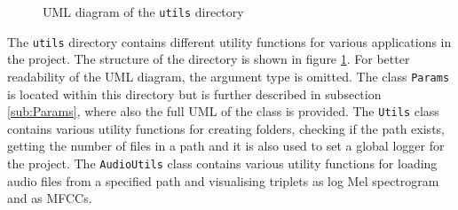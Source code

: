 \begin{figure}[htbp]
{
    }
	\caption{UML diagram of the \texttt{utils} directory}
	\label{fig:UML-Utils}
\end{figure}
\noindent
The \texttt{utils} directory contains different utility functions for various applications in the project. The structure of the directory is shown in figure \ref{fig:UML-Utils}. For better readability of the UML diagram, the argument type is omitted. The class \texttt{Params} is located within this directory but is further described in subsection \ref{sub:Params}, where also the full UML of the class is provided.
\newline
\newline
The \texttt{Utils} class contains various utility functions for creating folders, checking if the path exists, getting the number of files in a path and it is also used to set a global logger for the project.
\newline
\newline
The \texttt{AudioUtils} class contains various utility functions for loading audio files from a specified path and visualising triplets as log Mel spectrogram and as \glspl{MFCC}.
\newline
